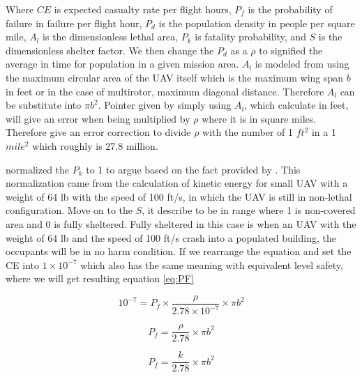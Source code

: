 \documentclass[12pt]{report}
\begin{document}
            Where \(CE\) is expected casualty rate per flight hours, \(P_f\) is the probability of failure in failure
            per flight hour, \(P_d\) is the population density in people per square mile, \(A_l\) is the dimensionless
            lethal area, \(P_k\) is fatality probability, and \(S\) is the dimensionless shelter factor. We then change
            the \(P_d\) as a \(\rho\) to signified the average in time for population in a given mission area. \(A_l\)
            is modeled from using the maximum circular area of the UAV itself which is the maximum wing span \(b\) in
            feet or in the case of multirotor, maximum diagonal distance. Therefore \(A_l\) can be substitute into \(\pi
            b^2\). Pointer given by \cite{burke_system-level_2011} simply using \(A_l\), which calculate in feet, will
            give an error when being multiplied by \(\rho\) where it is in square miles. Therefore
            \cite{burke_system-level_2011} give an error correction to divide \(\rho\) with the number of 1 \(ft^2\) in
            a 1 \(mile^2\) which roughly is 27.8 million. 

            \cite{burke_system-level_2011} normalized the \(P_k\) to 1 to argue based on the fact provided by
            \cite{arc_unmanned_2015}. This normalization came from the calculation of kinetic energy for small UAV with
            a weight of 64 lb with the speed of 100 ft/s, in which the UAV is still in non-lethal configuration. Move on
            to the \(S\), it describe to be in range where 1 is non-covered area and 0 is fully sheltered. Fully
            sheltered in this case is when an UAV with the weight of 64 lb and the speed of 100 ft/s crash into a
            populated building, the occupants will be in no harm condition. If we rearrange the equation and set the
            \ac{CE} into \(1 \times 10^{-7}\) which also has the same meaning with equivalent level safety, where we
            will get resulting equation \ref{eq:PF}

            \begin{equation}\label{eq:PF}
                10^{-7}= P_f \times \frac{\rho}{2.78 \times 10^{-7}} \times \pi b^2
            \end{equation}

            \begin{equation}
                P_f =  \frac{\rho}{2.78} \times \pi b^2
            \end{equation}

            \begin{equation}
                P_f =  \frac{k}{2.78} \times \pi b^2
            \end{equation}
\end{document}
